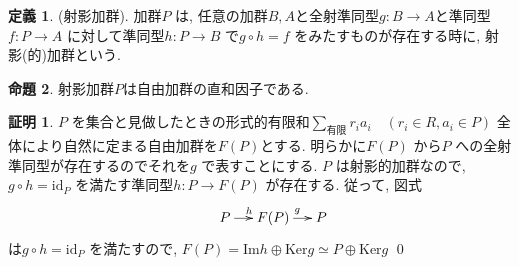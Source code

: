 \documentclass[10pt, fleqn, label-section=none]{bxjsarticle}
\theoremstyle{definition}
\newtheorem{dfn}{定義}[section]
\newtheorem{prop}[dfn]{命題}
\newtheorem*{pf*}{証明}
\newcommand{\Ker}{\textrm{Ker}}
\newcommand{\im}{\textrm{Im}}
\renewcommand{\;}{\, ; \,}
\begin{document}
\begin{dfn}(射影加群).
加群$P$ は, 任意の加群$B, A$と全射準同型$g:B \rightarrow A$と準同型$f: P \rightarrow A$ に対して準同型$h: P \rightarrow B$ で$g \circ h = f$ をみたすものが存在する時に, 射影(的)加群という.
\end{dfn}

\begin{prop}
射影加群$P$は自由加群の直和因子である. 
\end{prop}
\begin{pf*}
$P$ を集合と見做したときの形式的有限和$\displaystyle \sum_{\textrm{有限}} r_i a_i \quad (r_i \in R, a_i \in P)$ 全体により自然に定まる自由加群を$F(P)$とする. 明らかに$F(P)$ から$P$ への全射準同型が存在するのでそれを$g$ で表すことにする. 
$P$ は射影的加群なので, $g \circ h = \textrm{id}_P $ を満たす準同型$h: P \rightarrow F(P)$ が存在する. 従って, 図式
\begin{align*}  \xymatrix@C=13pt{
  &P \ar[r]^h &F(P)  \ar[r]^g &P  
} \end{align*}
は$g \circ h = \textrm{id}_P$ を満たすので, $F(P) = \im h \oplus \Ker g  \simeq P \oplus \Ker g$
\qed
\end{pf*}
\end{document}
